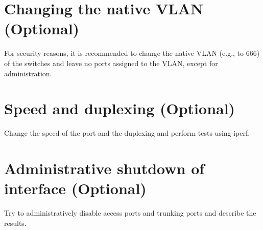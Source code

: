 \section{Changing the native VLAN (Optional)}

For security reasons, it is recommended to change the native VLAN (e.g., to 666) of the switches and leave no ports assigned to the VLAN, except for administration.

\section{Speed and duplexing (Optional)}

Change the speed of the port and the duplexing and perform tests using iperf.

\section{Administrative shutdown of interface (Optional)}

Try to administratively disable access ports and trunking ports and describe the results.










